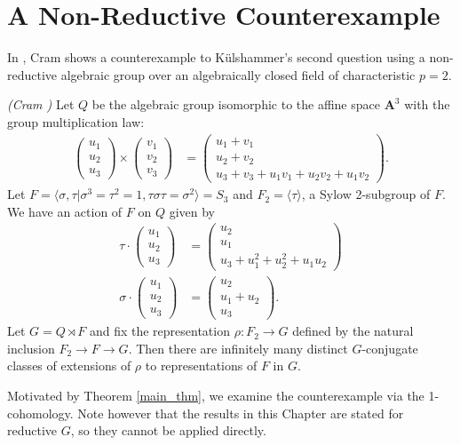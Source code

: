 \section{A Non-Reductive Counterexample}
In \cite[Appendix]{slodowy1997two}, Cram shows a counterexample to K\"ulshammer's second question using a non-reductive algebraic group over an algebraically closed field of characteristic $p=2$.
\begin{example}\emph{(Cram \cite[Appendix]{slodowy1997two})} Let $Q$ be the algebraic group isomorphic to the affine space $\mathbf{A}^3$ with the group multiplication law:
\begin{align*}
	\left(\begin{matrix} u_1 \\ u_2 \\ u_3 \end{matrix}\right) \times
	\left(\begin{matrix} v_1 \\ v_2 \\ v_3 \end{matrix}\right) &=
	\left(\begin{matrix} u_1 + v_1 \\ u_2 + v_2 \\ u_3 + v_3 + u_1v_1 + u_2v_2 + u_1v_2 \end{matrix}\right).
\end{align*}
Let $F = \langle \sigma, \tau | \sigma^3 = \tau^2 = 1, \tau\sigma\tau = \sigma^2 \rangle = S_3$ and $F_2 = \langle \tau \rangle$, a Sylow 2-subgroup of $F$. We have an action of $F$ on $Q$ given by
\begin{align*}
	\tau \cdot \left(\begin{matrix} u_1 \\ u_2 \\ u_3 \end{matrix} \right) &=
	\left(\begin{matrix} u_2 \\ u_1 \\ u_3 + u_1^2 + u_2^2 + u_1u_2 \end{matrix} \right) \\
	\sigma \cdot \left(\begin{matrix} u_1 \\ u_2 \\ u_3 \end{matrix} \right) &=
	\left(\begin{matrix} u_2 \\ u_1 + u_2 \\ u_3 \end{matrix} \right).
\end{align*}
Let $G = Q \rtimes F$ and fix the representation $\rho:F_2 \rightarrow G$ defined by the natural inclusion $F_2 \rightarrow F \rightarrow G$. Then there are infinitely many distinct $G$-conjugate classes of extensions of $\rho$ to representations of $F$ in $G$.
\label{eg:non_red}
\end{example}
Motivated by Theorem \ref{main_thm}, we examine the counterexample via the 1-cohomology. Note however that the results in this Chapter are stated for reductive $G$, so they cannot be applied directly.

